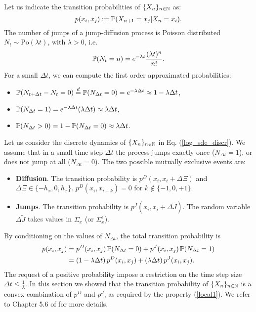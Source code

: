 Let us indicate the transition probabilities of $\{X_n\}_{n\in \mathbb{N}}$ as: 
\begin{equation}
 p(x_{i},x_{j}) := \mathbb{P}(X_{n+1} = x_{j} | X_n = x_{i}). 
\end{equation}
The number of jumps of a jump-diffusion process is Poisson distributed $N_t \sim \mbox{Po}(\lambda t)$, with $\lambda >0$, i.e.
\begin{equation}
 \mathbb{P}(N_t = n) = e^{-\lambda t} \frac{ (\lambda t)^n }{n!}.
\end{equation}
For a small $\Delta t$, we can compute the first order approximated probabilities:
\begin{itemize}
 \item $\mathbb{P}( N_{t+\Delta t} - N_t = 0) \overset{d}{=} \mathbb{P}( N_{\Delta t} = 0) = e^{-\lambda \Delta t } \approx 1-\lambda \Delta t $,
 \item $\mathbb{P}( N_{\Delta t} = 1) = e^{-\lambda \Delta t } (\lambda \Delta t) \approx \lambda \Delta t $,
 \item $\mathbb{P}( N_{\Delta t} > 0) = 1-\mathbb{P}( N_{\Delta t} = 0) \approx \lambda \Delta t $.
\end{itemize}
Let us consider the discrete dynamics of $\{X_n\}_{n\in \mathbb{N}}$ in Eq. (\ref{log_sde_discr}). 
We assume that in a small time step $\Delta t$ the process jumps exactly once ($N_{\Delta t} = 1$), or does not jump at all ($N_{\Delta t} = 0$).
The two possible mutually exclusive events are:
\begin{itemize}
 \item \textbf{Diffusion}. 
 The transition probability is $p^D(x_i, x_i + \Delta \Xi)$ and $\Delta \Xi \in \{ -h_x,0,h_x \}$.
 $p^D(x_i, x_{i+k}) = 0$ for $k \not \in \{-1,0,+1\}$. 
 \item \textbf{Jumps}. 
 The transition probability is $p^J(x_i, x_i + \Delta \tilde J)$. The random variable $\Delta \tilde J$ takes values 
 in $\Sigma_x$ (or $\Sigma^{\epsilon}_x$).
\end{itemize}
By conditioning on the values of $N_{\Delta t}$, the total transition probability is  
\begin{align}
 p(x_{i},x_{j}) &= p^D(x_{i},x_{j}) \, \mathbb{P}( N_{\Delta t} = 0) + p^J(x_{i},x_{j}) \, \mathbb{P}( N_{\Delta t} = 1) \\ \nonumber
	&= (1-\lambda \Delta t) \, p^D(x_{i},x_{j}) + (\lambda \Delta t ) \, p^J(x_{i},x_{j}).
\end{align}
The request of a positive probability impose a restriction on the time step size $\Delta t \leq \frac{1}{\lambda}$.
In this section we showed that the transition probability of $\{X_n\}_{n\in \mathbb{N}}$ is a convex combination of $p^D$ and $p^J$, 
as required by the property (\ref{local1}).
We refer to Chapter 5.6 of \cite{Kushner} for more details.




